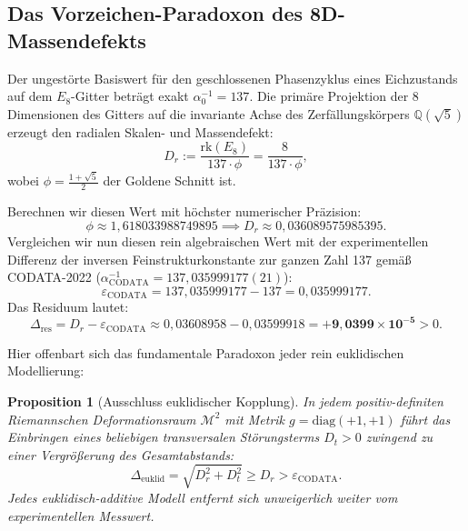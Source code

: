 \documentclass[11pt,a4paper]{article}
\newtheorem{proposition}[theorem]{Proposition}
\theoremstyle{definition}
\theoremstyle{remark}
\numberwithin{equation}{section}
\begin{document}
\subsection{Das Vorzeichen-Paradoxon des 8D-Massendefekts}

Der ungestörte Basiswert für den geschlossenen Phasenzyklus eines Eichzustands auf dem $E_8$-Gitter beträgt exakt $\alpha_0^{-1} = 137$.
Die primäre Projektion der 8 Dimensionen des Gitters auf die invariante Achse des Zerfällungskörpers $\mathbb{Q}(\sqrt{5})$ erzeugt den radialen Skalen- und Massendefekt:
\begin{equation}
D_r := \frac{\mathrm{rk}(E_8)}{137 \cdot \phi} = \frac{8}{137 \cdot \phi},
\end{equation}
wobei $\phi = \frac{1+\sqrt{5}}{2}$ der Goldene Schnitt ist.

Berechnen wir diesen Wert mit höchster numerischer Präzision:
\begin{equation}
\phi \approx 1{,}618033988749895 \implies D_r \approx 0{,}036089575985395.
\end{equation}
Vergleichen wir nun diesen rein algebraischen Wert mit der experimentellen Differenz der inversen Feinstrukturkonstante zur ganzen Zahl 137 gemäß CODATA-2022 ($\alpha^{-1}_{\mathrm{CODATA}} = 137{,}035999177(21)$):
\begin{equation}
\varepsilon_{\mathrm{CODATA}} = 137{,}035999177 - 137 = 0{,}035999177.
\end{equation}
Das Residuum lautet:
\begin{equation}
\Delta_{\mathrm{res}} = D_r - \varepsilon_{\mathrm{CODATA}} \approx 0{,}03608958 - 0{,}03599918 = \mathbf{+9{,}0399 \times 10^{-5}} > 0.
\end{equation}

Hier offenbart sich das fundamentale Paradoxon jeder rein euklidischen Modellierung:
\begin{proposition}[Ausschluss euklidischer Kopplung]
In jedem positiv-definiten Riemannschen Deformationsraum $\mathcal{M}^2$ mit Metrik $g = \mathrm{diag}(+1, +1)$ führt das Einbringen eines beliebigen transversalen Störungsterms $D_t > 0$ zwingend zu einer Vergrößerung des Gesamtabstands:
\begin{equation}
\Delta_{\mathrm{euklid}} = \sqrt{D_r^2 + D_t^2} \ge D_r > \varepsilon_{\mathrm{CODATA}}.
\end{equation}
Jedes euklidisch-additive Modell entfernt sich unweigerlich weiter vom experimentellen Messwert.
\end{proposition}
\end{document}
